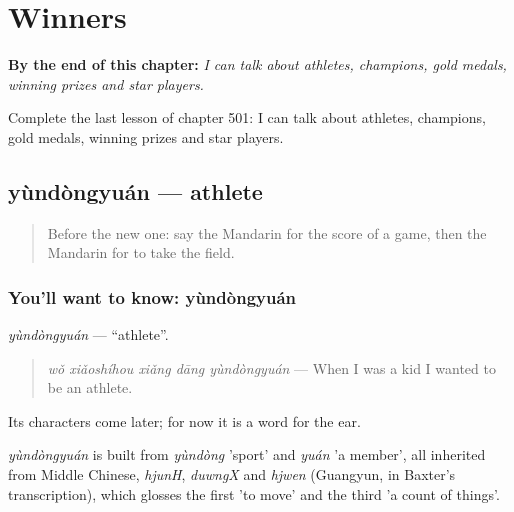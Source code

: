 
\chapter{Winners}
\label{ch:zh-winners}

\begin{chapteropening}
\textbf{By the end of this chapter:} \emph{I can talk about athletes, champions, gold medals, winning prizes and star players.}

Complete the last lesson of chapter 501: I can talk about athletes, champions, gold medals, winning prizes and star players.
\end{chapteropening}

\section[yùndòngyuán]{yùndòngyuán — athlete}

\label{lesson:ZH-C501-yundongyuan}



\begin{quote}
Before the new one: say the Mandarin for the score of a game, then the Mandarin for to take the field.
\end{quote}

\subsection*{You'll want to know: yùndòngyuán}
\emph{yùndòngyuán} — \textquotedblleft{}athlete\textquotedblright{}.

\begin{quote}
\emph{wǒ xiǎoshíhou xiǎng dāng yùndòngyuán} — When I was a kid I wanted to be an athlete.
\end{quote}

Its characters come later; for now it is a word for the ear.

\begin{cousinweb}
\emph{yùndòngyuán} is built from \emph{yùndòng} 'sport' and \emph{yuán} 'a member', all inherited from Middle Chinese, \emph{hjunH}, \emph{duwngX} and \emph{hjwen} (Guangyun, in Baxter's transcription), which glosses the first 'to move' and the third 'a count of things'.
\end{cousinweb}

